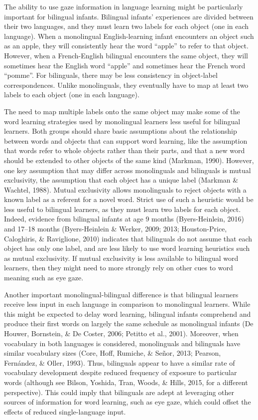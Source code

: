 \documentclass[,man,floatsintext]{apa6}
\begin{document}
The ability to use gaze information in language learning might be particularly important for bilingual infants. Bilingual infants' experiences are divided between their two languages, and they must learn two labels for each object (one in each language). When a monolingual English-learning infant encounters an object such as an apple, they will consistently hear the word \enquote{apple} to refer to that object. However, when a French-English bilingual encounters the same object, they will sometimes hear the English word \enquote{apple} and sometimes hear the French word \enquote{pomme}. For bilinguals, there may be less consistency in object-label correspondences. Unlike monolinguals, they eventually have to map at least two labels to each object (one in each language).

The need to map multiple labels onto the same object may make some of the word learning strategies used by monolingual learners less useful for bilingual learners. Both groups should share basic assumptions about the relationship between words and objects that can support word learning, like the assumption that words refer to whole objects rather than their parts, and that a new word should be extended to other objects of the same kind (Markman, 1990). However, one key assumption that may differ across monolinguals and bilinguals is mutual exclusivity, the assumption that each object has a unique label (Markman \& Wachtel, 1988). Mutual exclusivity allows monolinguals to reject objects with a known label as a referent for a novel word. Strict use of such a heuristic would be less useful to bilingual learners, as they must learn two labels for each object. Indeed, evidence from bilingual infants at age 9 months (Byers-Heinlein, 2016) and 17--18 months (Byers-Heinlein \& Werker, 2009; 2013; Houston-Price, Caloghiris, \& Raviglione, 2010) indicates that bilinguals do not assume that each object has only one label, and are less likely to use word learning heuristics such as mutual exclusivity. If mutual exclusivity is less available to bilingual word learners, then they might need to more strongly rely on other cues to word meaning such as eye gaze.

Another important monolingual-bilingual difference is that bilingual learners receive less input in each language in comparison to monolingual learners. While this might be expected to delay word learning, bilingual infants comprehend and produce their first words on largely the same schedule as monolingual infants (De Houwer, Bornstein, \& De Coster, 2006; Petitto et al., 2001). Moreover, when vocabulary in both languages is considered, monolinguals and bilinguals have similar vocabulary sizes (Core, Hoff, Rumiche, \& Señor, 2013; Pearson, Fernández, \& Oller, 1993). Thus, bilinguals appear to have a similar rate of vocabulary development despite reduced frequency of exposure to particular words (although see Bilson, Yoshida, Tran, Woods, \& Hills, 2015, for a different perspective). This could imply that bilinguals are adept at leveraging other sources of information for word learning, such as eye gaze, which could offset the effects of reduced single-language input.
\end{document}
